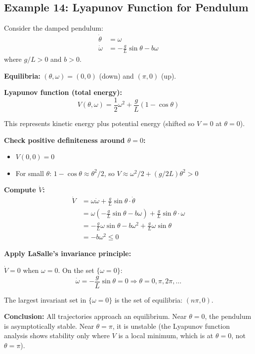 \subsection{Example 14: Lyapunov Function for Pendulum}

\begin{example}
\label{ex:pendulum_lyapunov}
Consider the damped pendulum:
\begin{align}
\dot{\theta} &= \omega \\
\dot{\omega} &= -\frac{g}{L}\sin\theta - b\omega
\end{align}
where $g/L > 0$ and $b > 0$.

\textbf{Equilibria:} $(\theta, \omega) = (0, 0)$ (down) and $(\pi, 0)$ (up).

\textbf{Lyapunov function (total energy):}
\begin{equation}
V(\theta, \omega) = \frac{1}{2}\omega^2 + \frac{g}{L}(1 - \cos\theta)
\end{equation}

This represents kinetic energy plus potential energy (shifted so $V = 0$ at $\theta = 0$).

\textbf{Check positive definiteness around $\theta = 0$:}
\begin{itemize}
    \item $V(0, 0) = 0$ \checkmark
    \item For small $\theta$: $1 - \cos\theta \approx \theta^2/2$, so $V \approx \omega^2/2 + (g/2L)\theta^2 > 0$ \checkmark
\end{itemize}

\textbf{Compute $\dot{V}$:}
\begin{align}
\dot{V} &= \omega\dot{\omega} + \frac{g}{L}\sin\theta \cdot \dot{\theta} \\
&= \omega\left(-\frac{g}{L}\sin\theta - b\omega\right) + \frac{g}{L}\sin\theta \cdot \omega \\
&= -\frac{g}{L}\omega\sin\theta - b\omega^2 + \frac{g}{L}\omega\sin\theta \\
&= -b\omega^2 \leq 0
\end{align}

\textbf{Apply LaSalle's invariance principle:}

$\dot{V} = 0$ when $\omega = 0$. On the set $\{\omega = 0\}$:
\begin{equation}
\dot{\omega} = -\frac{g}{L}\sin\theta = 0 \Rightarrow \theta = 0, \pi, 2\pi, \ldots
\end{equation}

The largest invariant set in $\{\omega = 0\}$ is the set of equilibria: $(n\pi, 0)$.

\textbf{Conclusion:} All trajectories approach an equilibrium. Near $\theta = 0$, the pendulum is asymptotically stable. Near $\theta = \pi$, it is unstable (the Lyapunov function analysis shows stability only where $V$ is a local minimum, which is at $\theta = 0$, not $\theta = \pi$).
\end{example}

